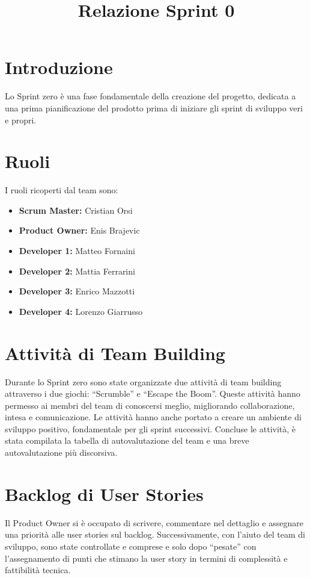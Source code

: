 \documentclass{article}
\title{Relazione Sprint 0}
\author{}
\date{}
\begin{document}
\maketitle

\section{Introduzione}
Lo Sprint zero è una fase fondamentale della creazione del progetto, dedicata a una prima pianificazione del prodotto prima di iniziare gli sprint di sviluppo veri e propri.

\section{Ruoli}
I ruoli ricoperti dal team sono:
\begin{itemize}[label={--}]
    \item \textbf{Scrum Master:} Cristian Orsi
    \item \textbf{Product Owner:} Enis Brajevic
    \item \textbf{Developer 1:} Matteo Fornaini
    \item \textbf{Developer 2:} Mattia Ferrarini
    \item \textbf{Developer 3:} Enrico Mazzotti
    \item \textbf{Developer 4:} Lorenzo Giarrusso
\end{itemize}

\section{Attività di Team Building}
Durante lo Sprint zero sono state organizzate due attività di team building attraverso i due giochi: “Scrumble” e “Escape the Boom”. Queste attività hanno permesso ai membri del team di conoscersi meglio, migliorando collaborazione, intesa e comunicazione. Le attività hanno anche portato a creare un ambiente di sviluppo positivo, fondamentale per gli sprint successivi. Concluse le attività, è stata compilata la tabella di autovalutazione del team e una breve autovalutazione più discorsiva.

\section{Backlog di User Stories}
Il Product Owner si è occupato di scrivere, commentare nel dettaglio e assegnare una priorità alle user stories sul backlog. Successivamente, con l’aiuto del team di sviluppo, sono state controllate e comprese e solo dopo “pesate” con l’assegnamento di punti che stimano la user story in termini di complessità e fattibilità tecnica.
\end{document}
